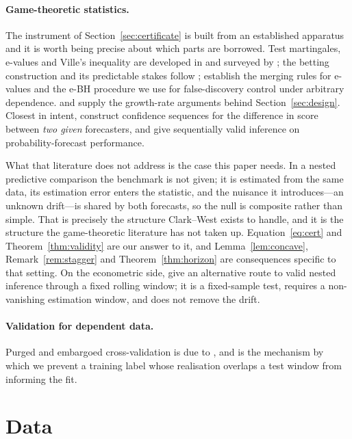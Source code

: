 \documentclass{article}
\theoremstyle{plain}
\theoremstyle{definition}
\begin{document}
\paragraph{Game-theoretic statistics.}
The instrument of Section~\ref{sec:certificate} is built from an established apparatus and it
is worth being precise about which parts are borrowed. Test martingales, e-values and Ville's
inequality \citep{ville1939} are developed in \citet{shafer2019} and surveyed by
\citet{ramdas2023}; the betting construction and its predictable stakes follow
\citet{waudbysmith2024}; \citet{vovk2021} establish the merging rules for e-values and
\citet{wang2022} the e-BH procedure we use for false-discovery control under arbitrary
dependence. \citet{kelly1956} and \citet{cover1991} supply the growth-rate arguments behind
Section~\ref{sec:design}. Closest in intent, \citet{choe2021} construct confidence sequences
for the difference in score between \emph{two given} forecasters, and \citet{henzi2022} give
sequentially valid inference on probability-forecast performance.

What that literature does not address is the case this paper needs. In a nested predictive
comparison the benchmark is not given; it is estimated from the same data, its estimation
error enters the statistic, and the nuisance it introduces---an unknown drift---is shared by
both forecasts, so the null is composite rather than simple. That is precisely the structure
Clark--West exists to handle, and it is the structure the game-theoretic literature has not
taken up. Equation~\eqref{eq:cert} and Theorem~\ref{thm:validity} are our answer to it, and
Lemma~\ref{lem:concave}, Remark~\ref{rem:stagger} and Theorem~\ref{thm:horizon} are
consequences specific to that setting. On the econometric side, \citet{giacomini2006} give an
alternative route to valid nested inference through a fixed rolling window; it is a
fixed-sample test, requires a non-vanishing estimation window, and does not remove the drift.

\paragraph{Validation for dependent data.}
Purged and embargoed cross-validation is due to \citet{lopezdeprado2018}, and is
the mechanism by which we prevent a training label whose realisation overlaps a
test window from informing the fit.

\section{Data}
\label{sec:data}
\end{document}
